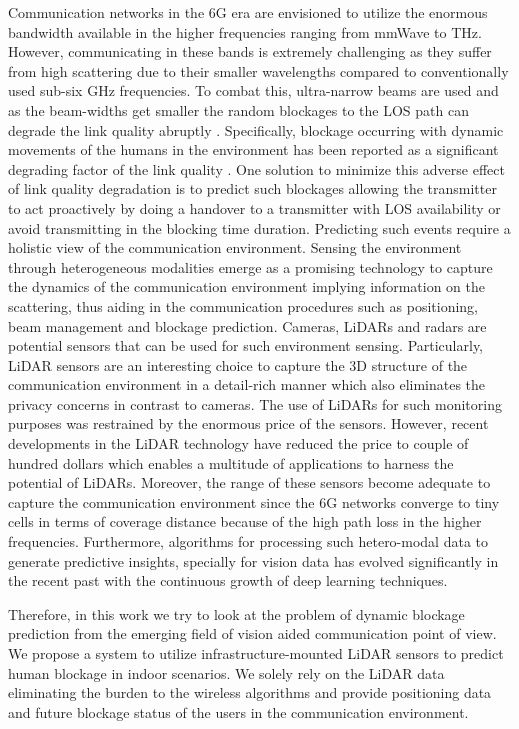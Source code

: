 \documentclass[conference]{IEEEtran}
\begin{document}
Communication networks in the 6G era are envisioned to utilize the enormous bandwidth available in the higher frequencies ranging from mmWave to THz. However, communicating in these bands is extremely challenging as they suffer from high scattering due to their smaller wavelengths compared to conventionally used sub-six GHz frequencies. To combat this, ultra-narrow beams are used and as the beam-widths get smaller the random blockages to the LOS path can degrade the link quality abruptly  \cite{tan2020thz}. Specifically,  blockage occurring with dynamic movements of the humans in the environment has been reported as a significant degrading factor of the link quality \cite{human_blockage}. One solution to minimize this adverse effect of link quality degradation is to predict such blockages allowing the transmitter to act proactively by doing a handover to a transmitter with LOS availability or avoid transmitting in the blocking time duration. Predicting such events require a holistic view of the communication environment. Sensing the environment through heterogeneous modalities emerge as a promising technology to capture the dynamics of the communication environment implying information on the scattering, thus aiding in the communication procedures such as positioning, beam management and blockage prediction. Cameras, LiDARs and radars are potential sensors that can be used for such environment sensing. Particularly, LiDAR sensors are an interesting choice to capture the 3D structure of the communication environment in a detail-rich manner which also eliminates the privacy concerns in contrast to cameras. The use of LiDARs for such monitoring purposes was restrained by the enormous price of the sensors. However, recent developments in the LiDAR technology have reduced the price to couple of hundred dollars which enables a multitude of applications to harness the potential of LiDARs. Moreover, the range of these sensors become adequate to capture the communication environment since the 6G networks converge to tiny cells in terms of coverage distance because of the high path loss in the higher frequencies. Furthermore, algorithms for processing such hetero-modal data to generate predictive insights, specially for vision data has evolved significantly in the recent past with the continuous growth of deep learning techniques.

Therefore, in this work we try to look at the problem of dynamic blockage prediction from the emerging field of vision aided communication point of view. We propose a system to utilize infrastructure-mounted LiDAR sensors \cite{NalinEliD, padmal2021elevated} to predict human blockage in indoor scenarios. We solely rely on the LiDAR data eliminating the burden to the wireless algorithms and provide positioning data and future blockage status of the users in the communication environment. 
\end{document}
